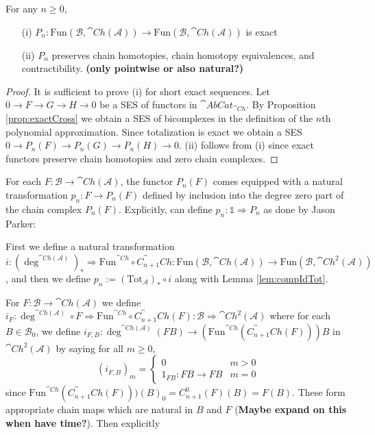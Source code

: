 \begin{prop}[label=prop:exactPol]
    For any $n \geq 0$,
    \begin{itemize}
        \item[(i)] $P_n:\text{Fun}(\mathcal{B},\cat{Ch}(\mathcal{A}))\rightarrow \text{Fun}(\mathcal{B},\cat{Ch}(\mathcal{A}))$ is exact
        \item[(ii)] $P_n$ preserves chain homotopies, chain homotopy equivalences, and contractibility. \textbf{(only pointwise or also natural?)}
    \end{itemize}
\end{prop}
\begin{proof}
    It is sufficient to prove (i) for short exact sequences. Let $0 \rightarrow F\rightarrow G\rightarrow H\rightarrow 0$ be a SES of functors in $\cat{AbCat}_{\cat{Ch}}$. By Proposition \ref{prop:exactCross} we obtain a SES of bicomplexes in the definition of the $n$th polynomial approximation. Since totalization is exact we obtain a SES $0 \rightarrow P_n(F)\rightarrow P_n(G)\rightarrow P_n(H)\rightarrow 0$. (ii) follows from (i) since exact functors preserve chain homotopies and zero chain complexes.
\end{proof}

For each $F:\mathcal{B}\rightarrow \cat{Ch}(\mathcal{A})$, the functor $P_n(F)$ comes equipped with a natural transformation $p_n:F\rightarrow P_n(F)$ defined by inclusion into the degree zero part of the chain complex $P_n(F)$. Explicitly, can define $p_n:\mathbb{1}\Rightarrow P_n$ as done by Jason Parker:

\begin{rmk}[label=defn:littlepN]
    First we define a natural transformation $i:(\deg^{\cat{Ch}(\mathcal{A})})_*\Rightarrow \text{Fun}^{\cat{Ch}}\circ C_{n+1}^\cat{Ch}:\text{Fun}(\mathcal{B},\cat{Ch}(\mathcal{A}))\rightarrow \text{Fun}(\mathcal{B},\cat{Ch}^2(\mathcal{A}))$, and then we define $p_n := (\text{Tot}_\mathcal{A})_*\circ i$ along with Lemma \ref{lem:compIdTot}. 


    For $F:\mathcal{B}\rightarrow \cat{Ch}(\mathcal{A})$ we define $i_F:\deg^{\cat{Ch}(\mathcal{A})}\circ F\Rightarrow \text{Fun}^{\cat{Ch}}\circ C_{n+1}^\cat{Ch}(F):\mathcal{B}\Rightarrow \cat{Ch}^2(\mathcal{A})$ where for each $B \in \mathcal{B}_0$, we define $i_{F,B}:\deg^{\cat{Ch}(\mathcal{A})}(FB)\rightarrow (\text{Fun}^{\cat{Ch}}(C_{n+1}^\cat{Ch}(F)))B$ in $\cat{Ch}^2(\mathcal{A})$ by saying for all $m \geq 0$,
    \begin{equation*}
        (i_{F,B})_m = \left\{\begin{array}{cc} 0 & m > 0 \\
        1_{FB}:FB\rightarrow FB & m = 0 \end{array}\right.
    \end{equation*}
    since $\text{Fun}^{\cat{Ch}}(C_{n+1}^\cat{Ch}(F)))(B)_0 = C_{n+1}^0(F)(B) = F(B)$. These form appropriate chain maps which are natural in $B$ and $F$ (\textbf{Maybe expand on this when have time?}). Then explicitly
\end{rmk}


